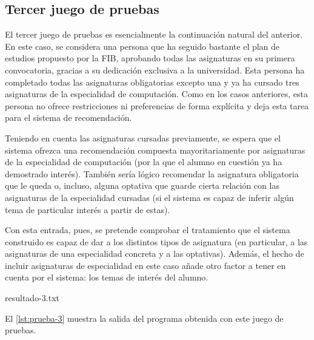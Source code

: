 
\subsection{Tercer juego de pruebas} \label{sec:prueba-3}

El tercer juego de pruebas es esencialmente la continuación natural del 
anterior. En este caso, se considera una persona que ha seguido bastante 
el plan de estudios propuesto por la FIB, aprobando todas las asignaturas en 
su primera convocatoria, gracias a su dedicación exclusiva a la universidad. 
Esta persona ha completado todas las asignaturas obligatorias excepto una 
y ya ha cursado tres asignaturas de la especialidad de computación. Como en 
los casos anteriores, esta persona no ofrece restricciones ni preferencias de 
forma explícita y deja esta tarea para el sistema de recomendación.

Teniendo en cuenta las asignaturas cursadas previamente, se espera que el 
sistema ofrezca una recomendación compuesta mayoritariamente por asignaturas 
de la especialidad de computación (por la que el alumno en cuestión ya ha 
demostrado interés). También sería lógico recomendar la asignatura obligatoria 
que le queda o, incluso, alguna optativa que guarde cierta relación con las 
asignaturas de la especialidad cursadas (si el sistema es capaz de inferir 
algún tema de particular interés a partir de estas).

Con esta entrada, pues, se pretende comprobar el tratamiento que el sistema 
construido es capaz de dar a los distintos tipos de asignatura (en particular, 
a las asignaturas de una especialidad concreta y a las optativas). Además, 
el hecho de incluir asignaturas de especialidad en este caso añade otro factor 
a tener en cuenta por el sistema: los temas de interés del alumno.

%
    {resultado-3.txt}

El \autoref{lst:prueba-3} muestra la salida del programa obtenida con este 
juego de pruebas.


